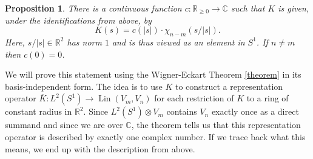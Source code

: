\documentclass[12pt, a4paper]{article}
\theoremstyle{plain}
\newtheorem{pro}{Proposition}[section]
\theoremstyle{definition}
\theoremstyle{remark}
\newcommand{\R}{\mathds{R}}
\newcommand{\C}{\mathds{C}}
\DeclareMathOperator{\lin}{Lin}
\begin{document}
\begin{pro}\label{Wigner-Eckart}
There is a continuous function $c: \R_{\geq 0} \to \C$ such that $K$ is given, under the identifications from above, by
\begin{equation*}
K(s) = c\left(|s|\right) \cdot \chi_{n - m}\left(s/|s|\right).
\end{equation*}
Here, $s/|s| \in \R^2$ has norm $1$ and is thus viewed as an element in $S^1$. If $n \neq m$ then $c(0) = 0$.
\end{pro}

We will prove this statement using the Wigner-Eckart Theorem \ref{theorem} in its basis-independent form. The idea is to use $K$ to construct a representation operator $\overline{K}: L^2(S^1) \to \lin(V_m, V_n)$ for each restriction of $K$ to a ring of constant radius in $\R^2$. Since $L^2(S^1) \otimes V_m$ contains $V_n$ exactly once as a direct summand and since we are over $\C$, the theorem tells us that this representation operator is described by exactly one complex number. If we trace back what this means, we end up with the description from above.
\end{document}

